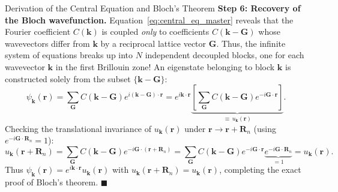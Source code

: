 \documentclass[11pt,a4paper]{article}
\newcommand{\kk}{\mathbf{k}}
\newcommand{\GG}{\mathbf{G}}
\newcommand{\RR}{\mathbf{R}}
\newcommand{\rvec}{\mathbf{r}}
\begin{document}
\begin{methodbox}{Derivation of the Central Equation and Bloch's Theorem}
\textbf{Step 6: Recovery of the Bloch wavefunction.}
Equation~\eqref{eq:central_eq_master} reveals that the Fourier coefficient $C(\kk)$ is coupled \emph{only} to coefficients $C(\kk-\GG)$ whose wavevectors differ from $\kk$ by a reciprocal lattice vector $\GG$. Thus, the infinite system of equations breaks up into $N$ independent decoupled blocks, one for each wavevector $\kk$ in the first Brillouin zone! An eigenstate belonging to block $\kk$ is constructed solely from the subset $\{\kk-\GG\}$:
\begin{equation}
    \psi_{\kk}(\rvec) = \sum_{\GG} C(\kk-\GG) e^{i(\kk-\GG)\cdot\rvec} = e^{i\kk\cdot\rvec} \underbrace{\left[ \sum_{\GG} C(\kk-\GG) e^{-i\GG\cdot\rvec} \right]}_{\equiv\, u_{\kk}(\rvec)}.
\end{equation}
Checking the translational invariance of $u_{\kk}(\rvec)$ under $\rvec \to \rvec + \RR_n$ (using $e^{-i\GG\cdot\RR_n} = 1$):
\begin{equation}
    u_{\kk}(\rvec + \RR_n) = \sum_{\GG} C(\kk-\GG) e^{-i\GG\cdot(\rvec + \RR_n)} = \sum_{\GG} C(\kk-\GG) e^{-i\GG\cdot\rvec} \underbrace{e^{-i\GG\cdot\RR_n}}_{=1} = u_{\kk}(\rvec).
\end{equation}
Thus $\psi_{\kk}(\rvec) = e^{i\kk\cdot\rvec}u_{\kk}(\rvec)$ with $u_{\kk}(\rvec + \RR_n) = u_{\kk}(\rvec)$, completing the exact proof of Bloch's theorem. $\blacksquare$
\end{methodbox}
\end{document}
